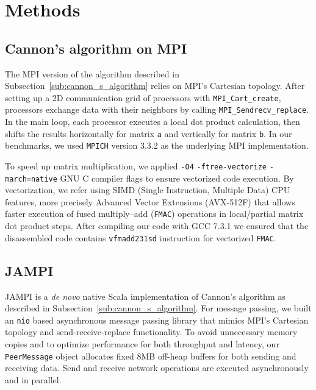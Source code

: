 \documentclass[bdcc,article,submit,moreauthors,pdftex]{Definitions/mdpi}
\begin{document}

 

\section{Methods} %
\label{sec:methods}

\subsection{Cannon's algorithm on MPI} %
\label{sub:cannon_s_algorithm_on_mpi}

The MPI version of the algorithm described in Subsection~\ref{sub:cannon_s_algorithm} relies on MPI's Cartesian topology. After setting up a 2D communication grid of processors with \texttt{MPI\_Cart\_create}, processors exchange data with their neighbors by calling \texttt{MPI\_Sendrecv\_replace}. In the main loop, each processor executes a local dot product calculation, then shifts the results horizontally for matrix \texttt{a} and vertically for matrix \texttt{b}. In our benchmarks, we used \texttt{MPICH} version 3.3.2 as the underlying MPI implementation.

To speed up matrix multiplication, we applied \texttt{-O4} \texttt{-ftree-vectorize} \texttt{-march=native} GNU C compiler flags to ensure vectorized code execution. By vectorization, we refer using SIMD (Single Instruction, Multiple Data) CPU features, more precisely Advanced Vector Extensions (AVX-512F) that allows faster execution of fused multiply–add (\texttt{{FMAC}}) operations in local/partial matrix dot product steps. After compiling our code with GCC 7.3.1 we ensured that the disassembled code contains \texttt{vfmadd231sd} instruction for vectorized \texttt{FMAC}. 


\subsection{JAMPI} %
\label{sub:jampi_implementation}

JAMPI is a \emph{de novo} native Scala implementation of Cannon's algorithm as described in Subsection~\ref{sub:cannon_s_algorithm}. For message passing, we built an \texttt{nio} based asynchronous message passing library that mimics MPI's Cartesian topology and send-receive-replace functionality. To avoid unnecessary memory copies and to optimize performance for both throughput and latency, our \texttt{PeerMessage} object allocates fixed 8MB off-heap buffers for both sending and receiving data. Send and receive network operations are executed asynchronously and in parallel.
\end{document}
